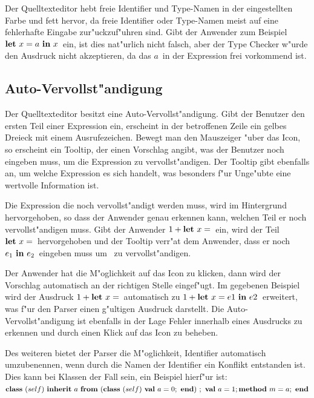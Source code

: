 Der Quelltexteditor hebt freie Identifier und Type-Namen in der eingestellten
Farbe und fett hervor, da freie Identifier oder Type-Namen meist auf eine
fehlerhafte Eingabe zur"uckzuf"uhren sind. Gibt der Anwender zum Beispiel
\glqq$\bli{x}{a}{x}$\grqq\ ein, ist dies nat"urlich nicht falsch, aber
der Type Checker w"urde den Ausdruck nicht akzeptieren, da das 
\glqq$a$\grqq\ in der Expression frei vorkommend ist.

\subsection{Auto-Vervollst"andigung}
\label{Auto-Vervollstaendigung}
Der Quelltexteditor besitzt eine Auto-Vervollst"andigung. Gibt der Benutzer
den ersten Teil einer Expression ein, erscheint in der betroffenen Zeile ein
gelbes Dreieck mit einem Ausrufezeichen. Bewegt man den Mauszeiger "uber
das Icon, so erscheint ein Tooltip, der einen Vorschlag angibt, was der
Benutzer noch eingeben muss, um die Expression zu vervollst"andigen. Der
Tooltip gibt ebenfalls an, um welche Expression es sich handelt, was
besonders f"ur Unge"ubte eine wertvolle Information ist.

Die Expression die noch vervollst"andigt werden muss, wird im Hintergrund
hervorgehoben, so dass der Anwender genau erkennen kann, welchen Teil er
noch vervollst"andigen muss. Gibt der Anwender \glqq$\infix{+}{1}{\blet\ x =}$\grqq\ 
ein, wird der Teil \glqq$\blet\ x =$\grqq\ hervorgehoben und der Tooltip
verr"at dem Anwender, dass er noch \glqq$e_1\ \bin\ e_2$\grqq\ eingeben muss
um \glqq{\bf Let}\grqq\ zu vervollst"andigen.

Der Anwender hat die M"oglichkeit auf das Icon zu klicken, dann wird der Vorschlag
automatisch an der richtigen Stelle eingef"ugt. Im gegebenen Beispiel
wird der Ausdruck \glqq$\infix{+}{1}{\blet\ x =}$\grqq\ automatisch zu
\glqq$\infix{+}{1}{\bli{x}{e1}{e2}}$\grqq\ erweitert, was f"ur den Parser einen
g"ultigen Ausdruck darstellt. Die Auto-Vervollst"andigung ist ebenfalls in
der Lage Fehler innerhalb eines Ausdrucks zu erkennen und durch einen Klick
auf das Icon zu beheben.

Des weiteren bietet der Parser die M"oglichkeit, Identifier automatisch
umzubenennen, wenn durch die Namen der Identifier ein Konflikt entstanden
ist. Dies kann bei Klassen der Fall sein, ein Beispiel hierf"ur ist:\\[2mm]
\glqq$\class{self}{\inherit{a}{(\class{self}{\val{a}{0}})}{\val{a}{1} \method{m}{a}}}$\grqq

